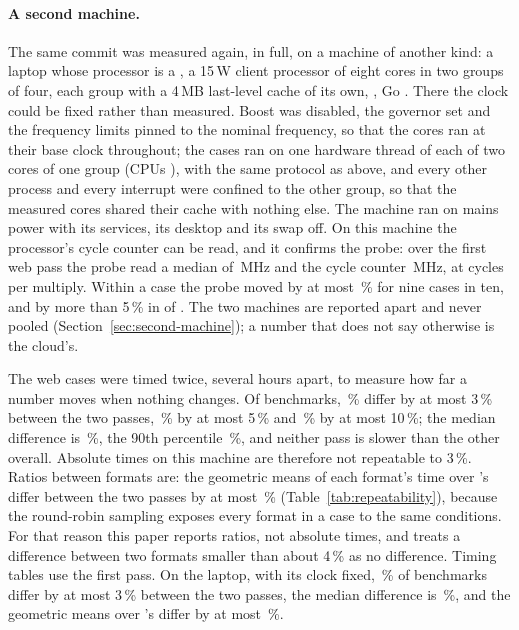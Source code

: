 \paragraph{A second machine.} The same commit was measured again, in full, on
a machine of another kind: a laptop whose processor is a , a
15\,W client processor of eight cores in two groups of four, each group
with a 4\,MB last-level cache of its own, ,
Go .
There the clock could be fixed rather than measured. Boost was disabled, the
 governor set and the frequency limits pinned to the
nominal frequency, so that the cores ran at their base clock throughout;
the cases ran on one hardware thread of each of two cores of one group
(CPUs ), with the
same protocol as above, and every other process and every interrupt were
confined to the other group, so that the measured cores shared their cache
with nothing else. The machine ran on mains power with its services, its
desktop and its swap off. On this machine the processor's cycle
counter can be read, and it confirms the probe: over the first web pass the
probe read a median of \,MHz and the
cycle counter \,MHz, at
 cycles per multiply. Within a
case the probe moved by at most \,\% for
nine cases in ten, and by more than 5\,\% in
 of .
The two machines are reported apart and never pooled
(Section~\ref{sec:second-machine}); a number that does not say otherwise is
the cloud's.

The web cases were timed twice, several hours apart, to measure how far a
number moves when nothing changes. Of  benchmarks,
\,\% differ by at most 3\,\% between the two passes,
\,\% by at most 5\,\% and \,\%
by at most 10\,\%; the median difference is \,\%, the
90th percentile \,\%, and neither pass is slower than
the other overall. Absolute times on
this machine are therefore not repeatable to 3\,\%. Ratios between formats
are: the geometric means of each format's
time over \colbin{}'s differ between the two passes by at most
\,\% (Table~\ref{tab:repeatability}), because the
round-robin sampling exposes every format in a case to the same conditions.
For that reason this paper reports ratios, not absolute times, and treats a
difference between two formats smaller than about 4\,\% as no difference.
Timing tables use the first pass. On the laptop, with its clock fixed,
\,\% of  benchmarks
differ by at most 3\,\% between the two passes, the median difference is
\,\%, and the geometric means over \colbin{}'s
differ by at most \,\%.

\begin{table}[t]
\centering\small
{}
\caption{Each format's time over \colbin{}'s, as a geometric mean over the
web cases both have, in the two timing passes.}
\label{tab:repeatability}
\end{table}
